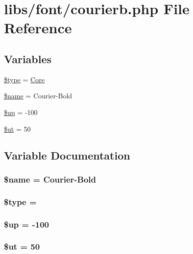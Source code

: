 \hypertarget{courierb_8php}{}\section{libs/font/courierb.php File Reference}
\label{courierb_8php}
\subsection*{Variables}
\begin{DoxyCompactItemize}
\item 
\hyperlink{courierb_8php_a9a4a6fba2208984cabb3afacadf33919}{\$type} = \textquotesingle{}\hyperlink{class_core}{Core}\textquotesingle{}
\item 
\hyperlink{courierb_8php_ab2fc40d43824ea3e1ce5d86dee0d763b}{\$name} = \textquotesingle{}Courier-\/Bold\textquotesingle{}
\item 
\hyperlink{courierb_8php_a6b5ad2ac55f9df46e8f34e78fbd6f176}{\$up} = -\/100
\item 
\hyperlink{courierb_8php_aadd3f841051043ee58e587e840e8dd0b}{\$ut} = 50
\end{DoxyCompactItemize}


\subsection{Variable Documentation}
\hypertarget{courierb_8php_ab2fc40d43824ea3e1ce5d86dee0d763b}{}
\subsubsection[{\$name}]{\setlength{\rightskip}{0pt plus 5cm}\$name = \textquotesingle{}Courier-\/Bold\textquotesingle{}}\label{courierb_8php_ab2fc40d43824ea3e1ce5d86dee0d763b}
\hypertarget{courierb_8php_a9a4a6fba2208984cabb3afacadf33919}{}
\subsubsection[{\$type}]{\setlength{\rightskip}{0pt plus 5cm}\$type = \textquotesingle{}}\label{courierb_8php_a9a4a6fba2208984cabb3afacadf33919}
\hypertarget{courierb_8php_a6b5ad2ac55f9df46e8f34e78fbd6f176}{}
\subsubsection[{\$up}]{\setlength{\rightskip}{0pt plus 5cm}\$up = -\/100}\label{courierb_8php_a6b5ad2ac55f9df46e8f34e78fbd6f176}
\hypertarget{courierb_8php_aadd3f841051043ee58e587e840e8dd0b}{}
\subsubsection[{\$ut}]{\setlength{\rightskip}{0pt plus 5cm}\$ut = 50}\label{courierb_8php_aadd3f841051043ee58e587e840e8dd0b}
